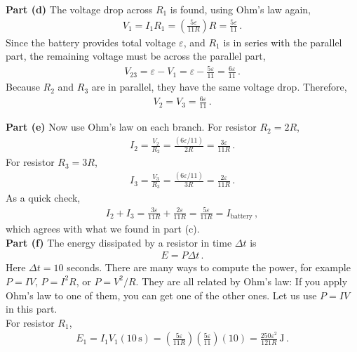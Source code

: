 \documentclass[11pt]{article}
\begin{document}
\noindent\textbf{Part (d)} The voltage drop across $R_1$ is found, using Ohm's law again,
\begin{align*}
V_1 = I_1R_1
= \left(\frac{5\varepsilon}{11R}\right)R
= \frac{5\varepsilon}{11}\,.
\end{align*}
Since the battery provides total voltage $\varepsilon$, and $R_1$ is in series with the parallel part, the remaining voltage must be across the parallel part,
\begin{align*}
V_{23} = \varepsilon - V_1
= \varepsilon - \frac{5\varepsilon}{11}
= \frac{6\varepsilon}{11}\,.
\end{align*}
Because $R_2$ and $R_3$ are in parallel, they have the same voltage drop. Therefore,
\begin{align*}
V_2 = V_3 = \frac{6\varepsilon}{11}\,.
\end{align*}

\noindent\textbf{Part (e)} Now use Ohm's law on each branch. For resistor $R_2 = 2R$,
\begin{align*}
I_2 = \frac{V_2}{R_2}
= \frac{(6\varepsilon/11)}{2R}
= \frac{3\varepsilon}{11R}\,.
\end{align*}
For resistor $R_3 = 3R$,
\begin{align*}
I_3 = \frac{V_3}{R_3}
= \frac{(6\varepsilon/11)}{3R}
= \frac{2\varepsilon}{11R}\,.
\end{align*}
As a quick check,
\begin{align*}
I_2 + I_3 = \frac{3\varepsilon}{11R}+\frac{2\varepsilon}{11R}
= \frac{5\varepsilon}{11R}
= I_{\text{battery}}\,,
\end{align*}
which agrees with what we found in part (c).\\

\noindent\textbf{Part (f)} The energy dissipated by a resistor in time $\Delta t$ is
\begin{align*}
E = P\Delta t\,.
\end{align*}
Here $\Delta t = 10$ seconds. There are many ways to compute the power, for example $P=IV$, $P=I^2R$, or $P=V^2/R$. They are all related by Ohm's law: If you apply Ohm's law to one of them, you can get one of the other ones. Let us use $P=IV$ in this part.\\

For resistor $R_1$,
\begin{align*}
E_1 = I_1V_1(10\,\text{s})
= \left(\frac{5\varepsilon}{11R}\right)\left(\frac{5\varepsilon}{11}\right)(10)
= \frac{250\varepsilon^2}{121R}\,\text{J}\,.
\end{align*}
\end{document}
